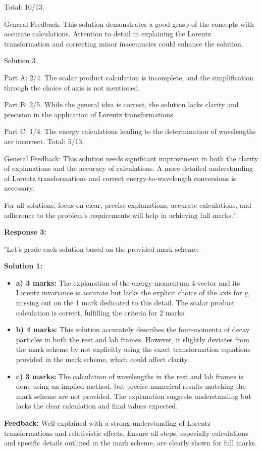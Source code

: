 \documentclass[a4paper,11pt]{article}
\begin{document}
Total: 10/13.

General Feedback: This solution demonstrates a good grasp of the concepts with accurate calculations. Attention to detail in explaining the Lorentz transformation and correcting minor inaccuracies could enhance the solution.

Solution 3

Part A: 2/4. The scalar product calculation is incomplete, and the simplification through the choice of axis is not mentioned.

Part B: 2/5. While the general idea is correct, the solution lacks clarity and precision in the application of Lorentz transformations.

Part C: 1/4. The energy calculations leading to the determination of wavelengths are incorrect.
Total: 5/13.

General Feedback: This solution needs significant improvement in both the clarity of explanations and the accuracy of calculations. A more detailed understanding of Lorentz transformations and correct energy-to-wavelength conversions is necessary.

For all solutions, focus on clear, precise explanations, accurate calculations, and adherence to the problem's requirements will help in achieving full marks."

\textbf{Response 3:}

"Let's grade each solution based on the provided mark scheme:

\textbf{Solution 1:}
\begin{itemize}
    \item \textbf{a) 3 marks:} The explanation of the energy-momentum 4-vector and its Lorentz invariance is accurate but lacks the explicit choice of the axis for \( \underline{v} \), missing out on the 1 mark dedicated to this detail. The scalar product calculation is correct, fulfilling the criteria for 2 marks.
    \item \textbf{b) 4 marks:} This solution accurately describes the four-momenta of decay particles in both the rest and lab frames. However, it slightly deviates from the mark scheme by not explicitly using the exact transformation equations provided in the mark scheme, which could affect clarity.
    \item \textbf{c) 3 marks:} The calculation of wavelengths in the rest and lab frames is done using an implied method, but precise numerical results matching the mark scheme are not provided. The explanation suggests understanding but lacks the clear calculation and final values expected.
\end{itemize}
\textbf{Feedback:} Well-explained with a strong understanding of Lorentz transformations and relativistic effects. Ensure all steps, especially calculations and specific details outlined in the mark scheme, are clearly shown for full marks.
\end{document}
